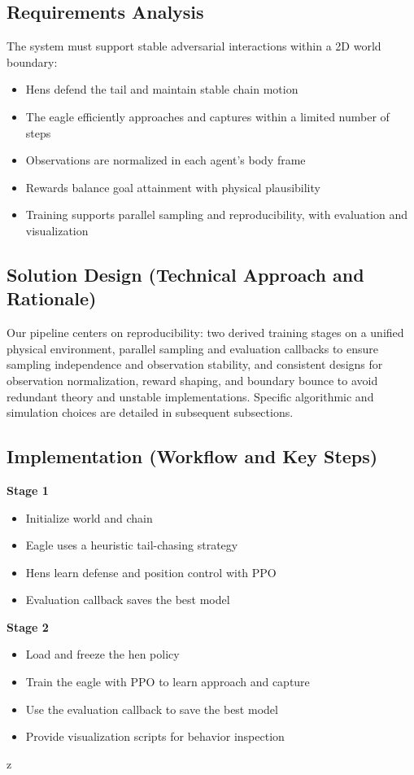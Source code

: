 \documentclass[12pt]{article}
\begin{document}
\subsection{Requirements Analysis}
The system must support stable adversarial interactions within a 2D world boundary:
\begin{itemize}
\item Hens defend the tail and maintain stable chain motion
\item The eagle efficiently approaches and captures within a limited number of steps
\item Observations are normalized in each agent’s body frame
\item Rewards balance goal attainment with physical plausibility
\item Training supports parallel sampling and reproducibility, with evaluation and visualization
\end{itemize}
\subsection{Solution Design (Technical Approach and Rationale)}
Our pipeline centers on reproducibility: two derived training stages on a unified physical environment, parallel sampling and evaluation callbacks to ensure sampling independence and observation stability, and consistent designs for observation normalization, reward shaping, and boundary bounce to avoid redundant theory and unstable implementations. Specific algorithmic and simulation choices are detailed in subsequent subsections.

\subsection{Implementation (Workflow and Key Steps)}
\textbf{Stage 1}
\begin{itemize}
\item Initialize world and chain
\item Eagle uses a heuristic tail-chasing strategy
\item Hens learn defense and position control with PPO
\item Evaluation callback saves the best model
\end{itemize}
\textbf{Stage 2}
\begin{itemize}
\item Load and freeze the hen policy
\item Train the eagle with PPO to learn approach and capture
\item Use the evaluation callback to save the best model
\item Provide visualization scripts for behavior inspection
\end{itemize}
z
\end{document}
